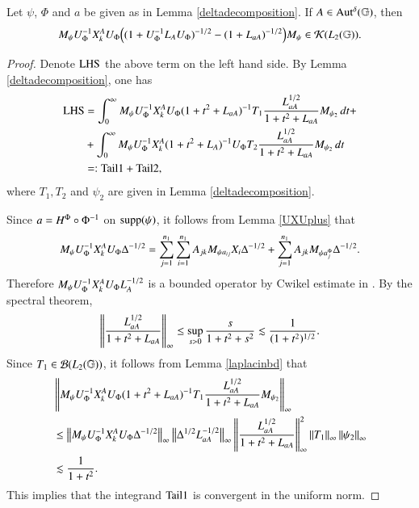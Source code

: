 \documentclass[leqno]{amsart}
\begin{document}
	\begin{lemma}\label{term4}
		Let $\psi$, $\Phi$ and $a$ be given as in Lemma \ref{deltadecomposition}. If $A\in{\rm Aut^{\delta}}(\mathbb{G})$, then
		$$M_{\psi}U_{\Phi}^{-1} X_{k}^{A}U_{\Phi}\Big((1+U_{\Phi}^{-1} L_{A} U_{\Phi})^{-1/2}-(1+{L_{aA}})^{-1/2}\Big)M_{\psi}\in{\mathcal K}(L_{2}(\mathbb{G})).$$
	\end{lemma}
	\begin{proof}
		Denote ${\rm LHS}$ the above term on the left hand side.
		By  Lemma \ref{deltadecomposition}, one has
		\begin{align*}
			{\rm LHS}
			&=\int_{0}^{\infty}M_{\psi}U_{\Phi}^{-1} X_{k}^{A}U_{\Phi}(1+t^{2}+{L_{aA}})^{-1}T_{1}\frac{L_{aA}^{1/2}}{1+t^{2}+{L_{aA}}}M_{\psi_{2}}\,dt+\\
			&+\int_{0}^{\infty}M_{\psi}U_{\Phi}^{-1} X_{k}^{A}(1+t^{2}+{L_{A}})^{-1}U_{\Phi}T_{2}\frac{L_{aA}^{1/2}}{1+t^{2}+{L_{aA}}}M_{\psi_{2}}\,dt\\
			&=:{\rm Tail1}+{\rm Tail2},
		\end{align*}
		where $T_{1},T_{2}$ and $\psi_{2}$ are given in  Lemma \ref{deltadecomposition}.
		
		Since $a=H^{\Phi}\circ\Phi^{-1}$ on ${\rm supp}(\psi)$, it follows from Lemma \ref{UXUplus} that
		\begin{align*}
			M_{\psi}U_{\Phi}^{-1} X_{k}^{A}U_{\Phi}\Delta^{-1/2}
			=\sum_{j=1}^{n_{1}}\sum_{i=1}^{n_{1}}A_{jk}M_{\psi a_{ij}}X_{i}\Delta^{-1/2}
			+\sum_{j=1}^{n_{1}}A_{jk}M_{\psi a_{j}^{\Phi}}\Delta^{-1/2}.
		\end{align*}
		Therefore $M_{\psi}U_{\Phi}^{-1} X_{k}^{A}U_{\Phi} L_{A}^{-1/2}$ is a bounded operator by Cwikel estimate in \cite{MSZ-Cwikel}.
		By the spectral theorem,
		\begin{align}\label{lapineq}
			\left\| \frac{ L_{aA}^{1/2}}{1+t^{2}+ L_{aA}} \right\|_{\infty}\leq\sup_{s>0}\frac{s}{1+t^{2}+s^{2}}
			\lesssim\frac{1}{(1+t^{2})^{1/2}}.
		\end{align}
		Since $T_{1}\in{\mathcal B}(L_{2}(\mathbb{G}))$,  it follows from Lemma \ref{laplacinbd} that
		\begin{align*}
			&\left\| M_{\psi}U_{\Phi}^{-1} X_{k}^{A}U_{\Phi}(1+t^{2}+ L_{aA})^{-1}T_{1}\frac{ L_{aA}^{1/2}}{1+t^{2}+ L_{aA}}M_{\psi_{2}} \right\|_{\infty}\\
			&\leq\left\| M_{\psi}U_{\Phi}^{-1} X_{k}^{A}U_{\Phi} \Delta^{-1/2} \right\|_{\infty}\left\|  \Delta^{1/2} L_{aA}^{-1/2} \right\|_{\infty}
			\left\| \frac{ L_{aA}^{1/2}}{1+t^{2}+ L_{aA}} \right\|_{\infty}^{2}\left\| T_{1} \right\|_{\infty}\left\| \psi_{2} \right\|_{\infty}\\
			&\lesssim\frac{1}{1+t^{2}}.
		\end{align*}
		This implies that the integrand ${\rm Tail1}$ is convergent in the uniform norm.
		

\end{proof}
\end{document}
